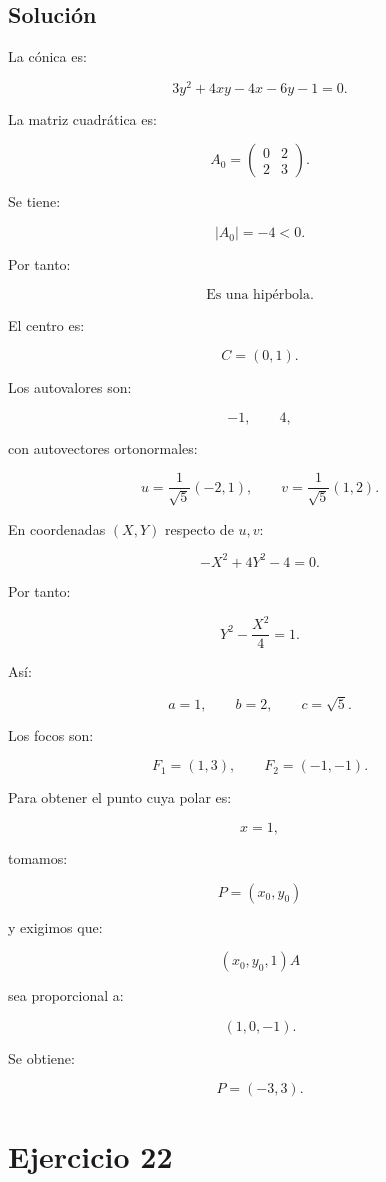 \documentclass[11pt,a4paper]{article}
\begin{document}
\subsection{Solución}

La cónica es:

\[
3y^2+4xy-4x-6y-1=0.
\]

La matriz cuadrática es:

\[
A_0=
\begin{pmatrix}
0&2\\
2&3
\end{pmatrix}.
\]

Se tiene:

\[
|A_0|=-4<0.
\]

Por tanto:

\[
\boxed{\text{Es una hipérbola}.}
\]

El centro es:

\[
\boxed{
C=(0,1).
}
\]

Los autovalores son:

\[
-1,
\qquad
4,
\]

con autovectores ortonormales:

\[
u=
\frac1{\sqrt5}(-2,1),
\qquad
v=
\frac1{\sqrt5}(1,2).
\]

En coordenadas \((X,Y)\) respecto de \(u,v\):

\[
-X^2+4Y^2-4=0.
\]

Por tanto:

\[
\boxed{
Y^2-\frac{X^2}{4}=1.
}
\]

Así:

\[
a=1,
\qquad
b=2,
\qquad
c=\sqrt5.
\]

Los focos son:

\[
\boxed{
F_1=(1,3),
\qquad
F_2=(-1,-1).
}
\]

Para obtener el punto cuya polar es:

\[
x=1,
\]

tomamos:

\[
P=(x_0,y_0)
\]

y exigimos que:

\[
(x_0,y_0,1)A
\]

sea proporcional a:

\[
(1,0,-1).
\]

Se obtiene:

\[
\boxed{
P=(-3,3).
}
\]

\section{Ejercicio 22}
\end{document}
